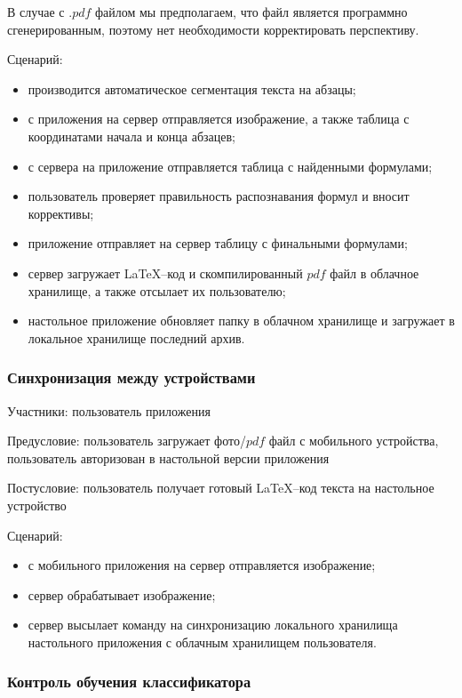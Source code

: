В случае с $.pdf$ файлом мы предполагаем, что файл является программно сгенерированным, поэтому нет необходимости корректировать перспективу.

Сценарий:
\begin{itemize}
    \item производится автоматическое сегментация текста на абзацы;
    \item с приложения на сервер отправляется изображение, а также таблица с координатами начала и конца абзацев;
    \item с сервера на приложение отправляется таблица с найденными формулами;
    \item пользователь проверяет правильность распознавания формул и вносит коррективы;
    \item приложение отправляет на сервер таблицу с финальными формулами;
    \item сервер загружает \LaTeX--код и скомпилированный $pdf$ файл в облачное хранилище, а также отсылает их пользователю;
    \item настольное приложение обновляет папку в облачном хранилище и загружает в локальное хранилище последний архив.
\end{itemize}

\subsubsection{Синхронизация между устройствами}
Участники: пользователь приложения

Предусловие: пользователь загружает фото/$pdf$ файл с мобильного устройства, пользователь авторизован в настольной версии приложения

Постусловие: пользователь получает готовый \LaTeX--код текста на настольное устройство

Сценарий:
\begin{itemize}
    \item с мобильного приложения на сервер отправляется изображение;
    \item сервер обрабатывает изображение;
    \item сервер высылает команду на синхронизацию локального хранилища настольного приложения с облачным хранилищем пользователя.
\end{itemize}

\subsubsection{Контроль обучения классификатора}

